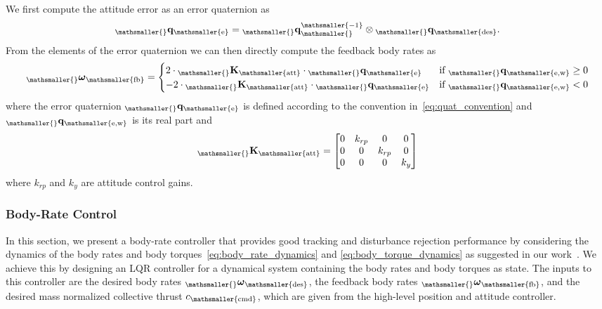 \documentclass[10pt,a4paper,fleqn]{article}
\newcommand{\vect}[3]{{_{\mathsmaller{\mathrm{#2}}}\mathbf{#1}_{\mathsmaller{\mathrm{#3}}}}} %
\newcommand{\vectss}[4]{{_{\mathsmaller{\mathrm{#2}}}\mathbf{#1}_{\mathsmaller{\mathrm{#3}}}^{\mathsmaller{\mathrm{#4}}}}} %
\newcommand{\bodyrate}[0]{\omega} %
\newcommand{\bodyrates}[0]{\boldsymbol{\bodyrate}} %
\newcommand{\thrust}[0]{c} %
\begin{document}
We first compute the attitude error as an error quaternion as
%
\begin{equation}
	\vect{q}{}{e} = \vectss{q}{}{}{-1} \otimes \vect{q}{}{des} .
\end{equation}
%
From the elements of the error quaternion we can then directly compute the feedback body rates as
%
\begin{equation}
	\vect{\bodyrates}{}{fb} = \begin{cases} 
		2 \cdot \vect{K}{}{att} \cdot \vect{q}{}{e} &\mbox{if } \vect{q}{}{e,w} \geq 0 \\
		- 2 \cdot \vect{K}{}{att} \cdot \vect{q}{}{e} &\mbox{if } \vect{q}{}{e,w} < 0 \end{cases}
\end{equation}
%
where the error quaternion $\vect{q}{}{e}$ is defined according to the convention in~\eqref{eq:quat_convention} and $\vect{q}{}{e,w}$ is its real part and
%
\begin{equation}
	\vect{K}{}{att} = \begin{bmatrix}
		0 & k_{rp} & 0 & 0 \\
		0 & 0 & k_{rp} & 0 \\
		0 & 0 & 0 & k_{y} \\
	\end{bmatrix}
\end{equation}
%
where $k_{rp}$ and $k_{y}$ are attitude control gains.

\subsubsection{Body-Rate Control}

In this section, we present a body-rate controller that provides good tracking and disturbance rejection performance by considering the dynamics of the body rates and body torques~\eqref{eq:body_rate_dynamics} and \eqref{eq:body_torque_dynamics} as suggested in our work~\cite{Faessler17ral}.
We achieve this by designing an LQR controller for a dynamical system containing the body rates and body torques as state.
The inputs to this controller are the desired body rates $\vect{\bodyrates}{}{des}$, the feedback body rates $\vect{\bodyrates}{}{fb}$, and the desired mass normalized collective thrust $\thrust_{\mathsmaller{\mathrm{cmd}}}$, which are given from the high-level position and attitude controller.
\end{document}
